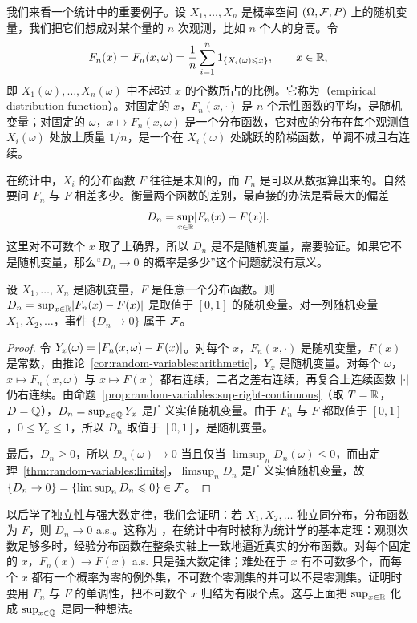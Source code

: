 我们来看一个统计中的重要例子。设 $X_1,\dots,X_n$ 是概率空间 $(\Omega,\mathcal{F},P)$ 上的随机变量，我们把它们想成对某个量的 $n$ 次观测，比如 $n$ 个人的身高。令
\[
F_n(x)=F_n(x,\omega)=\frac1n\sum_{i=1}^n1_{\{X_i(\omega)\leqslant x\}},\qquad x\in\mathbb{R},
\]
即 $X_1(\omega),\dots,X_n(\omega)$ 中不超过 $x$ 的个数所占的比例。它称为（empirical distribution function）。对固定的 $x$，$F_n(x,\cdot)$ 是 $n$ 个示性函数的平均，是随机变量；对固定的 $\omega$，$x\mapsto F_n(x,\omega)$ 是一个分布函数，它对应的分布在每个观测值 $X_i(\omega)$ 处放上质量 $1/n$，是一个在 $X_i(\omega)$ 处跳跃的阶梯函数，单调不减且右连续。

在统计中，$X_i$ 的分布函数 $F$ 往往是未知的，而 $F_n$ 是可以从数据算出来的。自然要问 $F_n$ 与 $F$ 相差多少。衡量两个函数的差别，最直接的办法是看最大的偏差
\[
D_n=\sup_{x\in\mathbb{R}}\lvert F_n(x)-F(x)\rvert.
\]
这里对不可数个 $x$ 取了上确界，所以 $D_n$ 是不是随机变量，需要验证。如果它不是随机变量，那么“$D_n\to0$ 的概率是多少”这个问题就没有意义。

\begin{proposition}\label{prop:random-variables:empirical}
设 $X_1,\dots,X_n$ 是随机变量，$F$ 是任意一个分布函数。则 $D_n=\sup_{x\in\mathbb{R}}\lvert F_n(x)-F(x)\rvert$ 是取值于 $[0,1]$ 的随机变量。对一列随机变量 $X_1,X_2,\dots$，事件 $\{D_n\to0\}$ 属于 $\mathcal{F}$。
\end{proposition}
\begin{proof}
令 $Y_x(\omega)=\lvert F_n(x,\omega)-F(x)\rvert$。对每个 $x$，$F_n(x,\cdot)$ 是随机变量，$F(x)$ 是常数，由推论~\ref{cor:random-variables:arithmetic}，$Y_x$ 是随机变量。对每个 $\omega$，$x\mapsto F_n(x,\omega)$ 与 $x\mapsto F(x)$ 都右连续，二者之差右连续，再复合上连续函数 $\lvert \cdot\rvert$ 仍右连续。由命题~\ref{prop:random-variables:sup-right-continuous}（取 $T=\mathbb{R}$，$D=\mathbb{Q}$），$D_n=\sup_{x\in\mathbb{Q}}Y_x$ 是广义实值随机变量。由于 $F_n$ 与 $F$ 都取值于 $[0,1]$，$0\leqslant Y_x\leqslant1$，所以 $D_n$ 取值于 $[0,1]$，是随机变量。

最后，$D_n\geqslant0$，所以 $D_n(\omega)\to0$ 当且仅当 $\limsup_nD_n(\omega)\leqslant0$，而由定理~\ref{thm:random-variables:limits}，$\limsup_nD_n$ 是广义实值随机变量，故 $\{D_n\to0\}=\{\limsup_nD_n\leqslant0\}\in\mathcal{F}$。
\end{proof}

\begin{remark}
以后学了独立性与强大数定律，我们会证明：若 $X_1,X_2,\dots$ 独立同分布，分布函数为 $F$，则 $D_n\to0$ a.s.。这称为 ，在统计中有时被称为统计学的基本定理：观测次数足够多时，经验分布函数在整条实轴上一致地逼近真实的分布函数。对每个固定的 $x$，$F_n(x)\to F(x)$ a.s. 只是强大数定律；难处在于 $x$ 有不可数多个，而每个 $x$ 都有一个概率为零的例外集，不可数个零测集的并可以不是零测集。证明时要用 $F_n$ 与 $F$ 的单调性，把不可数个 $x$ 归结为有限个点。这与上面把 $\sup_{x\in\mathbb{R}}$ 化成 $\sup_{x\in\mathbb{Q}}$ 是同一种想法。
\end{remark}

